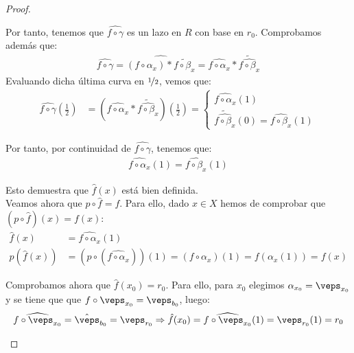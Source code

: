 \begin{teo}
\begin{proof}
\begin{description}
            Por tanto, tenemos que $\widehat{f\circ \gamma}$ es un lazo en $R$ con base en $r_0$. Comprobamos además que:
            \begin{gather*}
                \widehat{f\circ \gamma} = \widehat{(f\circ \alpha_x) \ast \tilde{f\circ \beta_x}} = \widehat{f\circ \alpha_x} \ast \widetilde{\widehat{f\circ \beta_x}}
            \end{gather*}
            Evaluando dicha última curva en $\nicefrac{1}{2}$, vemos que:
            \begin{align*}
                \widehat{f\circ \gamma}\left(\frac{1}{2}\right) &= \left(\widehat{f\circ \alpha_x} \ast \widetilde{\widehat{f\circ \beta_x}}\right)\left(\frac{1}{2}\right) = \begin{cases}
                    \widehat{f\circ \alpha_x}(1)\\
                    \widetilde{\widehat{f\circ \beta_x}}(0) = \widehat{f\circ \beta_x}(1)
                \end{cases}
            \end{align*}

            Por tanto, por continuidad de $\widehat{f\circ \gamma}$, tenemos que:
            \begin{gather*}
                \widehat{f\circ \alpha_x}(1) = \widehat{f\circ \beta_x}(1)
            \end{gather*}
            
            Esto demuestra que $\hat{f}(x)$ está bien definida.\\

            Veamos ahora que $p\circ \hat{f}=f$. Para ello, dado $x\in X$ hemos de comprobar que $(p\circ \hat{f})(x) = f(x)$:
            \begin{align*}
                \hat{f}(x) &= \widehat{f\circ \alpha_x}(1)\\
                p(\hat{f}(x)) &= (p\circ (\widehat{f\circ \alpha_x}))(1) = (f\circ \alpha_x)(1) = f(\alpha_x(1)) = f(x)
            \end{align*}

            Comprobamos ahora que $\hat{f}(x_0)=r_0$. Para ello, para $x_0$ elegimos $\alpha_{x_0}=\veps_{x_0}$ y se tiene que que $f\circ \veps_{x_0} = \veps_{b_0}$, luego:
            \begin{gather*}
                \widehat{f\circ \veps_{x_0}} = \hat{\veps}_{b_0} = \veps_{r_0} \Rightarrow \hat{f}(x_0) = \widehat{f\circ \veps_{x_0}}(1) = \veps_{r_0}(1) = r_0
            \end{gather*}


\end{description}
\end{proof}
\end{teo}
